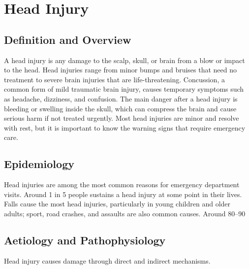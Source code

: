 \chapter{Head Injury}

\section*{Definition and Overview}
A head injury is any damage to the scalp, skull, or brain from a blow or impact to the head. Head injuries range from minor bumps and bruises that need no treatment to severe brain injuries that are life-threatening. Concussion, a common form of mild traumatic brain injury, causes temporary symptoms such as headache, dizziness, and confusion. The main danger after a head injury is bleeding or swelling inside the skull, which can compress the brain and cause serious harm if not treated urgently. Most head injuries are minor and resolve with rest, but it is important to know the warning signs that require emergency care.

\section*{Epidemiology}
Head injuries are among the most common reasons for emergency department visits. Around 1 in 5 people sustains a head injury at some point in their lives. Falls cause the most head injuries, particularly in young children and older adults; sport, road crashes, and assaults are also common causes. Around 80--90%

\section*{Aetiology and Pathophysiology}
Head injury causes damage through direct and indirect mechanisms.

